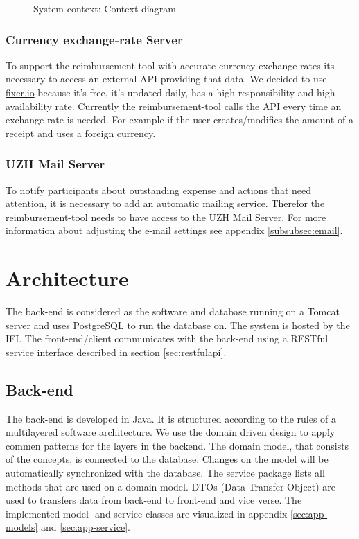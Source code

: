 \begin{figure}[H]
    \centering
    \caption{System context: Context diagram}
    \label{fig:context-diagram}
\end{figure}

\subsubsection{Currency exchange-rate Server}

To support the reimbursement-tool with accurate currency exchange-rates its necessary to access an external API providing that data. We decided to use \url{fixer.io} \cite{fixer} because it's free, it's updated daily, has a high responsibility and high availability rate. Currently the reimbursement-tool calls the API every time an exchange-rate is needed. For example if the user creates/modifies the amount of a receipt and uses a foreign currency.

\subsubsection{UZH Mail Server}
To notify participants about outstanding expense and actions that need attention, it is necessary to add an automatic mailing service. Therefor the reimbursement-tool needs to have access to the UZH Mail Server. For more information about adjusting the e-mail settings see appendix \ref{subsubsec:email}.\newpage


\section{Architecture}

The back-end is considered as the software and database running on a Tomcat \cite{tomcat} server and uses PostgreSQL \cite{postgresql} to run the database on. The system is hosted by the IFI. The front-end/client communicates with the back-end using a RESTful service interface described in section \ref{sec:restfulapi}.

\subsection{Back-end}
The back-end is developed in Java. It is structured according to the rules of a multilayered software architecture. We use the domain driven design \cite{ddd} to apply commen patterns for the layers in the backend. The domain model, that consists of the concepts, is connected to the database. Changes on the model will be automatically synchronized with the database. The service package lists all methods that are used on a domain model.\newline
DTOs (Data Transfer Object) are used to transfers data from back-end to front-end and vice verse. \newline The implemented model- and service-classes are visualized in appendix \ref{sec:app-models} and \ref{sec:app-service}. \par



